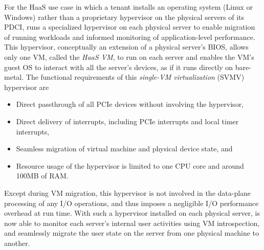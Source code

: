 For the HaaS use case in which a tenant installs an operating system (Linux or Windows) rather than a 
proprietary hypervisor on the physical servers of its PDCI, \na runs a specialized hypervisor on each 
physical server to enable migration of running workloads and informed monitoring of application-level performance. 
This hypervisor, conceptually an extension of a physical server's BIOS, allows only one VM, called the {\em HaaS VM}, 
to run on each server and enables the VM's guest OS to interact with all the server's devices, as 
if it runs directly on bare-metal.
The functional requirements of this {\em single-VM virtualization} (SVMV) hypervisor are
\begin{itemize} 
\setlength\itemsep{-0.04in}
\item Direct passthrough of all PCIe devices without involving the hypervisor,
\item Direct delivery of interrupts, including PCIe interrupts and local timer interrupts, 
\item Seamless migration of virtual machine and physical device state, and 
\item Resource usage of the hypervisor is limited to one CPU core and around 100MB of RAM.
\end{itemize}
Except during VM migration, this hypervisor is not involved in the data-plane processing of any I/O operations, 
and thus imposes a negligible I/O performance overhead at run time.  
With such a hypervisor installed on each physical server, \na is now able to monitor each 
server's internal user activities using VM introspection, and seamlessly migrate the user state 
on the server from one physical machine to another. 

